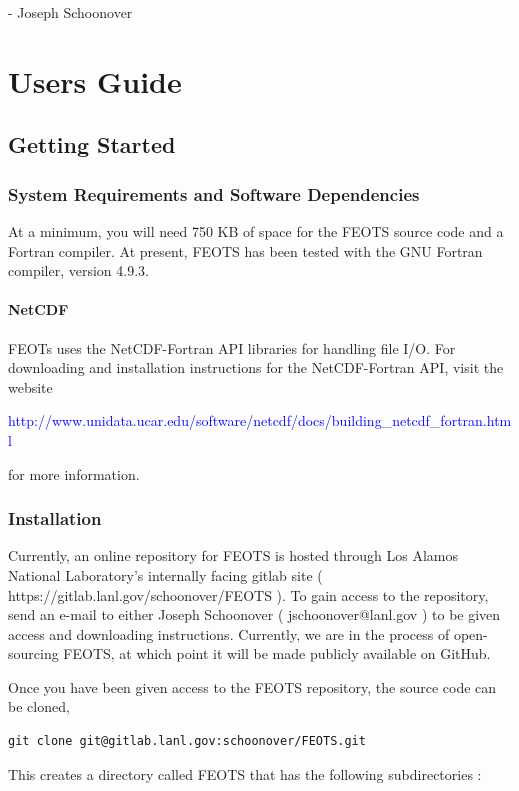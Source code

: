 \documentclass{softwaremanual}
\begin{document}
 \begin{flushright}
 - Joseph Schoonover
 \end{flushright}

\pagebreak

{\selectfont
\tableofcontents*
}
\mainmatter

\pagestyle{myheadings}
\part{Users Guide}
\chapter{Getting Started}

\section{System Requirements and Software Dependencies}
At a minimum, you will need 750 KB of space for the FEOTS source code and a Fortran compiler. At present, FEOTS has been tested with the GNU Fortran compiler, version 4.9.3.

\subsection{NetCDF}
 FEOTs uses the NetCDF-Fortran API libraries for handling file I/O. For downloading and installation instructions for the NetCDF-Fortran API, visit the website
 \begin{center}
 \textcolor{blue}{http://www.unidata.ucar.edu/software/netcdf/docs/building\_netcdf\_fortran.html}
 \end{center}
for more information.
  
\section{Installation}
  Currently, an online repository for FEOTS is hosted through Los Alamos National Laboratory's internally facing gitlab site ( https://gitlab.lanl.gov/schoonover/FEOTS ). To gain access to the repository, send an e-mail to either Joseph Schoonover ( jschoonover@lanl.gov ) to be given access and downloading instructions. Currently, we are in the process of open-sourcing FEOTS, at which point it will be made publicly available on GitHub.
  
Once you have been given access to the FEOTS repository, the source code can be cloned,
\begin{verbatim}
git clone git@gitlab.lanl.gov:schoonover/FEOTS.git
\end{verbatim}
This creates a directory called FEOTS that has the following subdirectories :
\end{document}
